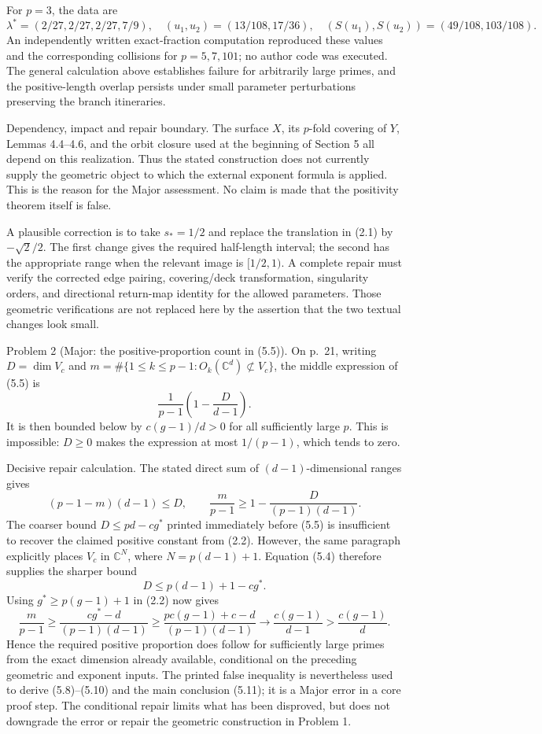 \documentclass[10pt]{article}
\begin{document}
For \(p=3\), the data are \[\lambda^*=(2/27,2/27,2/27,7/9),\quad
 (u_1,u_2)=(13/108,17/36),\quad
 (S(u_1),S(u_2))=(49/108,103/108).\] An independently written exact-fraction computation reproduced these values and the corresponding collisions for \(p=5,7,101\); no author code was executed. The general calculation above establishes failure for arbitrarily large primes, and the positive-length overlap persists under small parameter perturbations preserving the branch itineraries.\par
Dependency, impact and repair boundary. The surface \(X\), its \(p\)-fold covering of \(Y\), Lemmas 4.4–4.6, and the orbit closure used at the beginning of Section 5 all depend on this realization. Thus the stated construction does not currently supply the geometric object to which the external exponent formula is applied. This is the reason for the Major assessment. No claim is made that the positivity theorem itself is false.\par
A plausible correction is to take \(s_*=1/2\) and replace the translation in (2.1) by \(-\sqrt2/2\). The first change gives the required half-length interval; the second has the appropriate range when the relevant image is \([1/2,1)\). A complete repair must verify the corrected edge pairing, covering/deck transformation, singularity orders, and directional return-map identity for the allowed parameters. Those geometric verifications are not replaced here by the assertion that the two textual changes look small.\par
Problem 2 (Major: the positive-proportion count in (5.5)).  On p. 21, writing \(D=\dim V_c\) and \(m=\#\{1\le k\le p-1:O_k(\mathbb C^d)\not\subset V_c\}\), the middle expression of (5.5) is \[\frac1{p-1}\left(1-\frac D{d-1}\right).\] It is then bounded below by \(c(g-1)/d>0\) for all sufficiently large \(p\). This is impossible: \(D\ge0\) makes the expression at most \(1/(p-1)\), which tends to zero.\par
Decisive repair calculation. The stated direct sum of \((d-1)\)-dimensional ranges gives \[(p-1-m)(d-1)\le D,\qquad
 \frac{m}{p-1}\ge1-\frac{D}{(p-1)(d-1)}.
 \tag{2.2}\] The coarser bound \(D\le pd-cg^*\) printed immediately before (5.5) is insufficient to recover the claimed positive constant from (2.2). However, the same paragraph explicitly places \(V_c\) in \(\mathbb C^{N}\), where \(N=p(d-1)+1\). Equation (5.4) therefore supplies the sharper bound \[D\le p(d-1)+1-cg^*.\] Using \(g^*\ge p(g-1)+1\) in (2.2) now gives \[\frac{m}{p-1}
 \ge\frac{cg^*-d}{(p-1)(d-1)}
 \ge\frac{pc(g-1)+c-d}{(p-1)(d-1)}
 \longrightarrow\frac{c(g-1)}{d-1}>
 \frac{c(g-1)}d.\] Hence the required positive proportion does follow for sufficiently large primes from the exact dimension already available, conditional on the preceding geometric and exponent inputs. The printed false inequality is nevertheless used to derive (5.8)–(5.10) and the main conclusion (5.11); it is a Major error in a core proof step. The conditional repair limits what has been disproved, but does not downgrade the error or repair the geometric construction in Problem 1.\par
\end{document}
